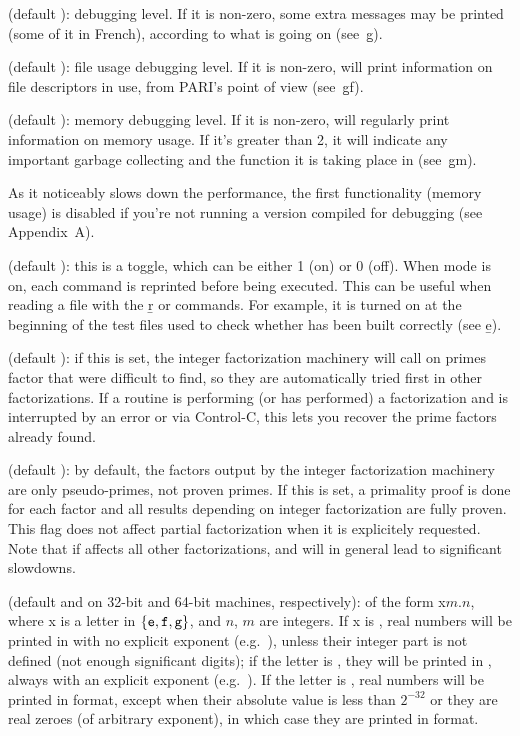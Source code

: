  (default ): debugging level. If it is non-zero,
some extra messages may be printed (some of it in French), according to
what is going on (see~\b{g}).

 (default ): file usage debugging level. If it
is non-zero,  will print information on file descriptors in use, from
PARI's point of view (see~\b{gf}).

 (default ): memory debugging level. If it is
non-zero,  will regularly print information on memory usage. If it's
greater than 2, it will indicate any important garbage collecting and the
function it is taking place in (see~\b{gm}).

 As it noticeably slows down the performance,
the first functionality (memory usage) is disabled if you're not running a
version compiled for debugging (see Appendix~A).

 (default ): this is a toggle, which can be either 1
(on) or 0 (off). When  mode is on, each command is reprinted before
being executed. This can be useful when reading a file with the \b{r} or
 commands. For example, it is turned on at the beginning of the
test files used to check whether  has been built correctly (see
\b{e}).

 (default ): if this is set, the integer
factorization machinery will call  on primes
factor that were difficult to find, so they are automatically tried first in
other factorizations. If a routine is performing (or has performed) a
factorization and is interrupted by an error or via Control-C, this lets you
recover the prime factors already found.

 (default ): by
default, the factors output by the integer factorization machinery are
only pseudo-primes, not proven primes. If this is
set, a primality proof is done for each factor and all results depending on
integer factorization are fully proven. This flag does not affect partial
factorization when it is explicitely requested. Note that if affects all
other factorizations, and will in general lead to significant slowdowns.

 (default  and  on 32-bit and
64-bit machines, respectively): of the form x$m.n$, where x is a letter in
$\{{\tt e},{\tt f},{\tt g}\}$, and $n$, $m$ are integers. If x is ,
real numbers will be printed in  with no
explicit exponent (e.g.~), unless their integer part is not
defined (not enough significant digits); if the letter is , they
will be printed in , always with an explicit
exponent (e.g.~). If the letter is , real numbers will
be printed in  format, except when their absolute value is less than
$2^{-32}$ or they are real zeroes (of arbitrary exponent), in which case
they are printed in  format.\label{se:format}

